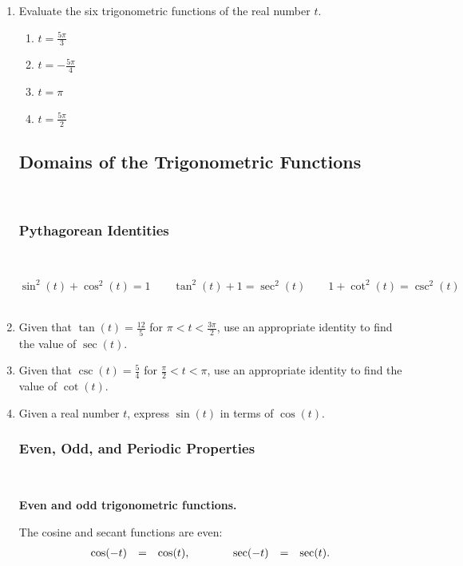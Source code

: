 \begin{enumerate}
\item Evaluate the six trigonometric functions of the real number $t$.
\begin{enumerate}
\item $\displaystyle t=\frac{5\pi}{3}$
\newpage
\item $\displaystyle t=-\frac{5\pi}{4}$\vfill
\item $\displaystyle t=\pi$\vfill
\item $\displaystyle t=\frac{5\pi}{2}$\vfill
\end{enumerate}


\newpage

\subsection{Domains of the Trigonometric Functions} ~


\subsubsection{Pythagorean Identities} ~

$$\sin^2(t)+\cos^2(t)=1 \quad \quad \tan^2(t)+1=\sec^2(t) \quad \quad 1+\cot^2(t)=\csc^2(t)$$
\\

\item Given that $\tan(t)=\frac{12}{5}$ for $\pi < t < \frac{3\pi}{2}$, use an appropriate identity to find the value of $\sec(t)$.\\[2in]

\item Given that $\csc(t)=\frac{5}{4}$ for $\frac{\pi}{2} < t < \pi$, use an appropriate identity to find the value of $\cot(t)$.\\[2in]

\item Given a real number $t$, express $\sin(t)$ in terms of $\cos(t)$.\\[1.5in]

\newpage

\subsubsection{Even, Odd, and Periodic Properties} ~

   \noindent\colorbox{blue!10}{%
   \parbox{\dimexpr\linewidth}%
   {%
     \textbf{Even and odd trigonometric functions.}

     The cosine and secant functions are even:
     \begin{eqnarray*}
       \begin{array}{rcl@{\hspace{4em}}rcl}
         \cos(-t) & = & \cos(t), & \sec(-t) & = & \sec(t).
       \end{array}
     \end{eqnarray*}

}}
\end{enumerate}
